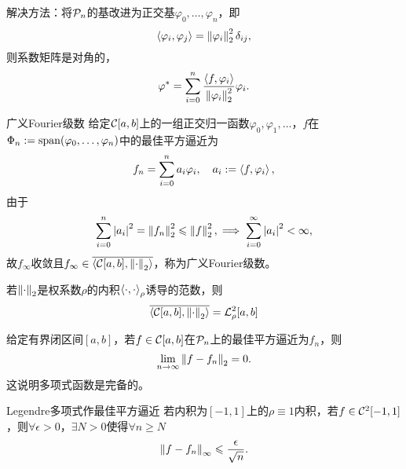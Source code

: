 \begin{remark}
    解决方法：将$\mathcal P_n$的基改进为正交基$\varphi_0,\ldots,\varphi_n$，即
    \[
        \left\langle \varphi_i,\varphi_j\right\rangle=\left\lVert\varphi_i\right\rVert_2^2\delta_{ij},
    \]
    则系数矩阵是对角的，
    \begin{equation}
        \varphi^*=\sum_{i=0}^n\frac{\left\langle f,\varphi_i\right\rangle}{\left\lVert\varphi_i\right\rVert_2^2}\varphi_i.
    \end{equation}
\end{remark}

\begin{definition}
    {广义Fourier级数}{}
    给定$\mathcal C[a,b]$上的一组正交归一函数$\varphi_0,\varphi_1,\ldots$，$f$在$\Phi_n:=\operatorname{span}(\varphi_0,\ldots,\varphi_n)$中的最佳平方逼近为
    \[
        f_n=\sum_{i=0}^na_i\varphi_i,\quad a_i:=\left\langle f,\varphi_i\right\rangle,
    \]
    由于
    \[
        \sum_{i=0}^n\left\lvert a_i\right\rvert^2=\left\lVert f_n\right\rVert_2^2\leqslant\left\lVert f\right\rVert_2^2,\implies\sum_{i=0}^\infty\left\lvert a_i\right\rvert^2<\infty,
    \]
    故$f_\infty$收敛且$f_\infty\in\overline{\left\langle \mathcal C[a,b],\left\lVert\cdot\right\rVert_2\right\rangle}$，称为广义Fourier级数。
\end{definition}

\begin{remark}
    若$\left\lVert\cdot\right\rVert_2$是权系数$\rho$的内积$\left\langle \cdot,\cdot\right\rangle_\rho$诱导的范数，则
    \begin{equation}
        \overline{\left\langle \mathcal C[a,b],\left\lVert\cdot\right\rVert_2\right\rangle}=\mathcal L_\rho^2[a,b]
    \end{equation}
\end{remark}

\begin{theorem}
    {}{}
    给定有界闭区间$[a,b]$，若$f\in\mathcal C[a,b]$在$\mathcal P_n$上的最佳平方逼近为$f_n$，则
    \begin{equation}
        \lim_{n\to\infty}\left\lVert f-f_n\right\rVert_2=0.
    \end{equation}
    这说明多项式函数是完备的。
\end{theorem}


\begin{theorem}
    {Legendre多项式作最佳平方逼近}{}
    若内积为$[-1,1]$上的$\rho\equiv 1$内积，若$f\in\mathcal C^2[-1,1]$，则$\forall\epsilon>0$，$\exists N>0$使得$\forall n\geq N$
    \begin{equation}
        \left\lVert f-f_n\right\rVert_\infty\leqslant\frac{\epsilon}{\sqrt n}.
    \end{equation}
\end{theorem}

